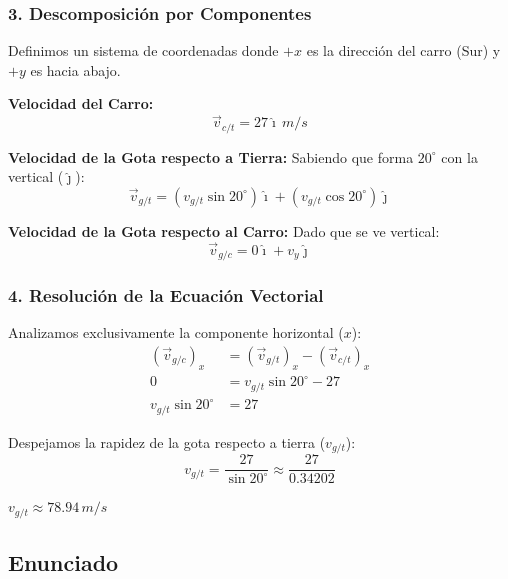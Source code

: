 \documentclass[12pt, a4paper]{article}
\begin{document}
\subsubsection*{3. Descomposición por Componentes}

Definimos un sistema de coordenadas donde $+x$ es la dirección del carro (Sur) y $+y$ es hacia abajo.

\textbf{Velocidad del Carro:}
\begin{equation}
    \vec{v}_{c/t} = 27 \hat{\imath} \, \si{m/s}
\end{equation}

\textbf{Velocidad de la Gota respecto a Tierra:}
Sabiendo que forma $20^\circ$ con la vertical ($\hat{\jmath}$):
\begin{equation}
    \vec{v}_{g/t} = (v_{g/t} \sin 20^\circ) \hat{\imath} + (v_{g/t} \cos 20^\circ) \hat{\jmath}
\end{equation}

\textbf{Velocidad de la Gota respecto al Carro:}
Dado que se ve vertical:
\begin{equation}
    \vec{v}_{g/c} = 0 \hat{\imath} + v_y \hat{\jmath}
\end{equation}

\subsubsection*{4. Resolución de la Ecuación Vectorial}

Analizamos exclusivamente la componente horizontal ($x$):
\begin{align*}
    (\vec{v}_{g/c})_x &= (\vec{v}_{g/t})_x - (\vec{v}_{c/t})_x \\
    0 &= v_{g/t} \sin 20^\circ - 27 \\
    v_{g/t} \sin 20^\circ &= 27
\end{align*}

Despejamos la rapidez de la gota respecto a tierra ($v_{g/t}$):
\begin{equation}
    v_{g/t} = \frac{27}{\sin 20^\circ} \approx \frac{27}{0.34202}
\end{equation}

\begin{tcolorbox}[colback=blue!5!white, colframe=blue!75!black, title=Respuesta Final]
\centering
\Large $v_{g/t} \approx 78.94 \, \si{m/s}$
\end{tcolorbox}

\newpage

\subsection*{Enunciado}
\end{document}
